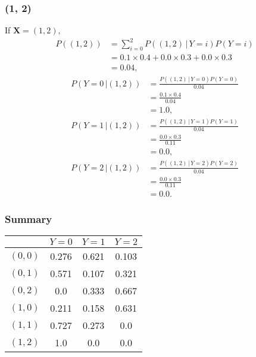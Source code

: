 \documentclass[10pt]{article}
\begin{document}
\subsubsection*{(1, 2)}
If $\textbf{X} = (1, 2)$, 
\begin{align*}
P((1, 2)) &= \sum_{i = 0}^2 P((1, 2) \, | \, Y = i)P(Y = i) \\
             &= 0.1 \times 0.4 + 0.0 \times 0.3 + 0.0 \times 0.3 \\
             &= 0.04,
\end{align*}
\begin{align*}
P(Y = 0 \, | (1,2)) &= \frac{P((1, 2) \, | \, Y = 0)P(Y = 0)}{ 0.04 } \\
                           &= \frac{0.1 \times 0.4}{ 0.04 } \\
                           &= 1.0,
\end{align*}
\begin{align*}
P(Y = 1 \, | (1,2)) &= \frac{ P((1, 2) \, | \, Y = 1)P(Y = 1) }{ 0.04 } \\
                           &= \frac{ 0.0 \times 0.3 }{ 0.11 } \\
                           &= 0.0,
\end{align*}
\begin{align*}
P(Y = 2 \, | (1,2)) &= \frac{P((1, 2) \, | \, Y = 2)P(Y = 2)}{ 0.04 } \\
                           &= \frac{ 0.0 \times 0.3 }{ 0.11 } \\
                           &= 0.0.
\end{align*}

\subsubsection*{Summary}
\begin{tabular}{|l|c|c|c|}
  \hline
  & $Y = 0$ & $Y = 1$ & $Y = 2$ \\
  \hline
  $(0, 0)$ & 0.276 & 0.621 & 0.103 \\
  \hline
  $(0, 1)$ & 0.571 & 0.107 & 0.321 \\
  \hline
  $(0, 2)$ & 0.0 & 0.333 & 0.667 \\
  \hline
  $(1, 0)$ & 0.211 & 0.158 & 0.631 \\
  \hline
  $(1, 1)$ & 0.727 & 0.273 & 0.0 \\
  \hline
  $(1, 2)$ & 1.0 & 0.0 & 0.0 \\
  \hline
\end{tabular}
\end{document}
